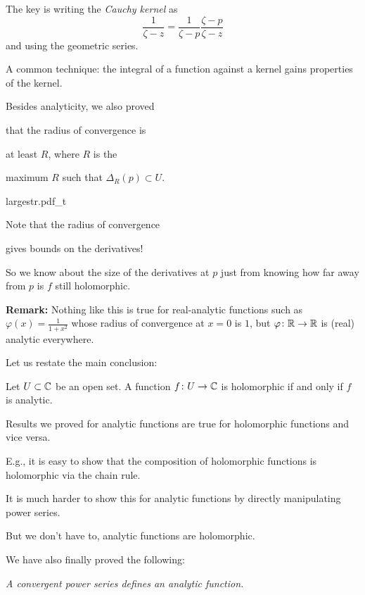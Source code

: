 \documentclass[10pt,aspectratio=169]{beamer}
\begin{document}
\begin{frame}

The key is writing the \emph{Cauchy kernel}
as
\[
\frac{1}{\zeta-z}
=
\frac{1}{\zeta-p}
\frac{\zeta-p}{\zeta-z}
\]
\pause
and using the geometric series.

\medskip

A common technique: the integral of a function against a kernel
gains properties of the kernel.

\pause
\medskip

Besides analyticity,
we also proved 

that the radius of convergence is

at least $R$, where $R$ is the

maximum $R$ such that $\Delta_R(p) \subset U$.

\vspace*{-0.85in}

\hspace*{2.5in}%
{largestr.pdf_t}

\pause

\vspace*{-0.30in}
Note that the radius of convergence

gives bounds on the derivatives!

\pause

So we know about
the size of the derivatives at $p$ just from knowing how far away from $p$
is
$f$ still holomorphic.

\medskip
\pause

\textbf{Remark:}
Nothing like this is true for real-analytic functions such as $\varphi(x) =
\frac{1}{1+x^2}$ whose radius of convergence at $x=0$ is $1$, but $\varphi \colon
{\mathbb{R}} \to {\mathbb{R}}$ is (real) analytic everywhere.

\end{frame}

\begin{frame}
Let us restate the main conclusion:

\begin{corollary}
Let $U \subset {\mathbb{C}}$ be an open set.  A function $f \colon U \to {\mathbb{C}}$
is holomorphic if and only if $f$ is analytic.
\end{corollary}

\medskip
\pause

Results we proved for analytic functions are true for holomorphic
functions and vice versa.

\medskip
\pause

E.g., it is easy to show 
that the composition of
holomorphic functions is holomorphic via the chain rule.

\pause
\medskip

It is much harder to show this for analytic functions
by directly manipulating power series.

\pause
\medskip

But we don't have to, analytic functions are holomorphic.

\pause
\medskip

We have also finally proved the following:

\emph{A convergent power series defines an analytic function.}
\end{frame}
\end{document}
